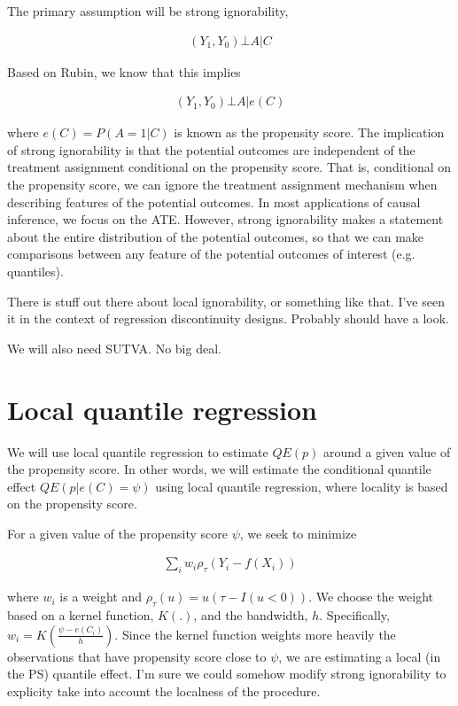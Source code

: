 \documentclass{article}\usepackage[]{graphicx}\usepackage[]{color}
\begin{document}
The primary assumption will be strong ignorability, 

\begin{align*}
  (Y_1,Y_0) \bot A | C
\end{align*}

\noindent Based on Rubin, we know that this implies 

\begin{align*}
  (Y_1,Y_0) \bot A | e(C)
\end{align*}

\noindent where $e(C)=P(A=1|C)$ is known as the propensity score. The implication of strong ignorability is that the potential outcomes are independent of the treatment assignment conditional on the propensity score. That is, conditional on the propensity score, we can ignore the treatment assignment mechanism when describing features of the potential outcomes. In most applications of causal inference, we focus on the ATE. However, strong ignorability makes a statement about the entire distribution of the potential outcomes, so that we can make comparisons between any feature of the potential outcomes of interest (e.g. quantiles). 

There is stuff out there about local ignorability, or something like that. I've seen it in the context of regression discontinuity designs. Probably should have a look. 

We will also need SUTVA. No big deal. 

\section{Local quantile regression}

We will use local quantile regression to estimate $QE(p)$ around a given value of the propensity score. In other words, we will estimate the conditional quantile effect $QE(p|e(C)=\psi)$ using local quantile regression, where locality is based on the propensity score.

For a given value of the propensity score $\psi$, we seek to minimize

\begin{align*}
  \sum_i w_i \rho_\tau( Y_i - f(X_i))
\end{align*}

where $w_i$ is a weight and $\rho_\tau(u)=u(\tau-I(u<0))$. We choose the weight based on a kernel function, $K(.)$, and the bandwidth, $h$. Specifically, $w_i=K( \frac{\psi-e(C_i)}{h})$. Since the kernel function weights more heavily the observations that have propensity score close to $\psi$, we are estimating a local (in the PS) quantile effect. I'm sure we could somehow modify strong ignorability to explicity take into account the localness of the procedure. 
\end{document}
